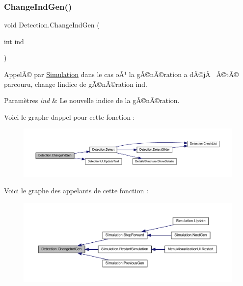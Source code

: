 \subsubsection{\texorpdfstring{Change\+Ind\+Gen()}{ChangeIndGen()}}
{\footnotesize\ttfamily void Detection.\+Change\+Ind\+Gen (\begin{DoxyParamCaption}\item[{int}]{ind }\end{DoxyParamCaption})\hspace{0.3cm}{\ttfamily [inline]}}



AppelÃ© par \mbox{\hyperlink{class_simulation}{Simulation}} dans le cas oÃ¹ la gÃ©nÃ©ration a dÃ©jÃ  Ã©tÃ© parcouru, change l\textquotesingle{}indice de gÃ©nÃ©ration ind. 


\begin{DoxyParams}{Paramètres}
{\em ind} & Le nouvelle indice de la gÃ©nÃ©ration.\\
\hline
\end{DoxyParams}
Voici le graphe d\textquotesingle{}appel pour cette fonction \+:
\nopagebreak
\begin{figure}[H]
\begin{center}
\leavevmode
\includegraphics[width=350pt]{class_detection_a70084049883e8e2ebecce5d24e84a196_cgraph}
\end{center}
\end{figure}
Voici le graphe des appelants de cette fonction \+:
\nopagebreak
\begin{figure}[H]
\begin{center}
\leavevmode
\includegraphics[width=350pt]{class_detection_a70084049883e8e2ebecce5d24e84a196_icgraph}
\end{center}
\end{figure}
\mbox{\label{class_detection_a2d8aeb536aa1051f0522f8317b14b36e}} 
